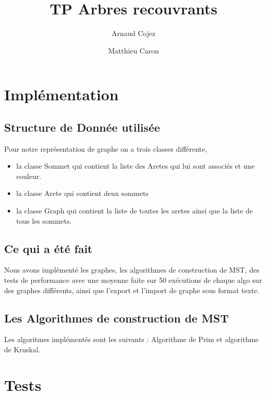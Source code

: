 \documentclass[a4paper,10pt]{report}
\title{TP Arbres recouvrants}
\author{Arnaud Cojez \and Matthieu Caron}
\begin{document}
\maketitle

\chapter{Implémentation}

\section{Structure de Donnée utilisée}
Pour notre représentation de graphe on a trois classes différente,
\begin{itemize}
 \item la classe Sommet qui contient la liste des Aretes qui lui sont associés et une couleur.
 \item la classe Arete qui contient deux sommets
 \item la classe Graph qui contient la liste de toutes les aretes ainsi que la liste de tous les sommets.
\end{itemize}

\section{Ce qui a été fait}
Nous avons implémenté les graphes, les algorithmes de construction de MST, des tests de performance avec une moyenne faite sur 50 exécutions de chaque algo sur des graphes différents, ainsi que l'export et l'import de graphe sous format texte. 

\section{Les Algorithmes de construction de MST}
Les algoritmes implémentés sont les suivants : Algorithme de Prim et algorithme de Kruskal.

\chapter{Tests}
\end{document}
